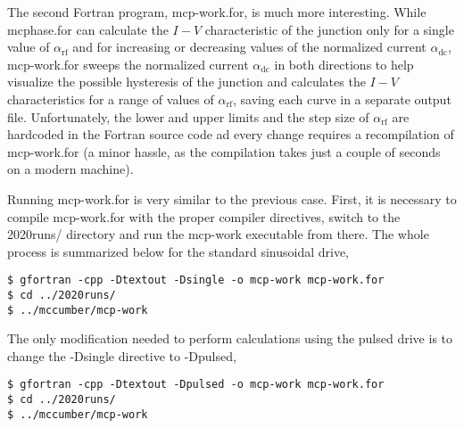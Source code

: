 The second Fortran program, \textsf{mcp-work.for}, is much more interesting. While \textsf{mcphase.for} can calculate the $I - V$ characteristic of the junction only for a single value of $\alpha_\mathrm{rf}$ and for increasing or decreasing values of the normalized current $\alpha_\mathrm{dc}$, \textsf{mcp-work.for} sweeps the normalized current $\alpha_\mathrm{dc}$ in both directions to help visualize the possible hysteresis of the junction and calculates the $I - V$ characteristics for a range of values of $\alpha_\mathrm{rf}$, saving each curve in a separate output file. Unfortunately, the lower and upper limits and the step size of $\alpha_\mathrm{rf}$ are hardcoded in the Fortran source code ad every change requires a recompilation of \textsf{mcp-work.for} (a minor hassle, as the compilation takes just a couple of seconds on a modern machine).


Running \textsf{mcp-work.for} is very similar to the previous case. First, it is necessary to compile \textsf{mcp-work.for} with the proper compiler directives, switch to the \textsf{2020runs/} directory and run the \textsf{mcp-work} executable from there. The whole process is summarized below for the standard sinusoidal drive,

\begin{lstlisting}
$ gfortran -cpp -Dtextout -Dsingle -o mcp-work mcp-work.for
$ cd ../2020runs/
$ ../mccumber/mcp-work
\end{lstlisting}

The only modification needed to perform calculations using the pulsed drive is to change the \textsf{-Dsingle} directive to \textsf{-Dpulsed},

\begin{lstlisting}
$ gfortran -cpp -Dtextout -Dpulsed -o mcp-work mcp-work.for
$ cd ../2020runs/
$ ../mccumber/mcp-work
\end{lstlisting}


